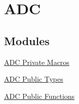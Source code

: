 \hypertarget{group___a_d_c}{\section{\-A\-D\-C}
\label{group___a_d_c}
}
\subsection*{\-Modules}
\begin{DoxyCompactItemize}
\item 
\hyperlink{group___a_d_c___private___macros}{\-A\-D\-C Private Macros}
\item 
\hyperlink{group___a_d_c___public___types}{\-A\-D\-C Public Types}
\item 
\hyperlink{group___a_d_c___public___functions}{\-A\-D\-C Public Functions}
\end{DoxyCompactItemize}
